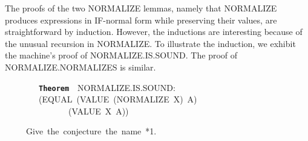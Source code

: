\documentclass[11pt]{book}
\newenvironment{pubasis}{\begin{flushleft}\ttfamily\small}{\normalsize\rmfamily\end{flushleft}}
\newcommand{\axiomordefinition}[1]{\vspace{6pt}\texttt{\textbf{#1}}}
\begin{document}
The proofs of the two NORMALIZE lemmas, namely that NORMALIZE produces expressions
in IF-normal form while preserving their values, are straightforward by
induction.  However, the inductions are interesting
because of the unusual recursion in NORMALIZE.  To illustrate the induction, we exhibit the
machine's proof of NOR\-MAL\-IZE.IS.SOUND.  The proof of NOR\-MAL\-IZE.NOR\-MAL\-IZES is similar.
\begin{pubasis}
~~~~~~~~\axiomordefinition{Theorem}~~NOR\-MAL\-IZE.IS.SOUND:\\
~~~~~~~~(EQUAL~(VALUE~(NORMALIZE~X)~A)\\
~~~~~~~~~~~~~~~(VALUE~X~A))\\
\end{pubasis}
\begin{pubasis}
~~~~~Give~the~conjecture~the~name~*1.\\


\end{pubasis}
\end{document}
